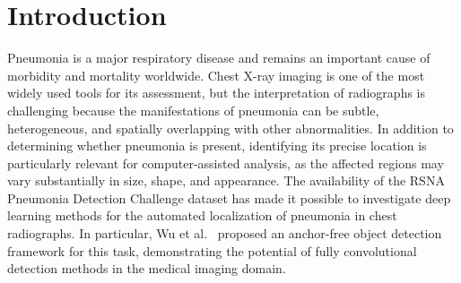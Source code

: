 \documentclass[11pt,a4paper]{article}
\begin{document}



%



\section{Introduction}
\label{sec:introduction}

Pneumonia is a major respiratory disease and remains an important cause of morbidity and mortality worldwide. 
Chest X-ray imaging is one of the most widely used tools for its assessment, but the interpretation of radiographs is challenging because the manifestations of pneumonia can be subtle, heterogeneous, and spatially overlapping with other abnormalities. 
In addition to determining whether pneumonia is present, identifying its precise location is particularly relevant for computer-assisted analysis, as the affected regions may vary substantially in size, shape, and appearance. 
The availability of the RSNA Pneumonia Detection Challenge dataset has made it possible to investigate deep learning methods for the automated localization of pneumonia in chest radiographs. 
In particular, Wu et al.~\cite{wu2024pneumonia} proposed an anchor-free object detection framework for this task, demonstrating the potential of fully convolutional detection methods in the medical imaging domain.
\end{document}
